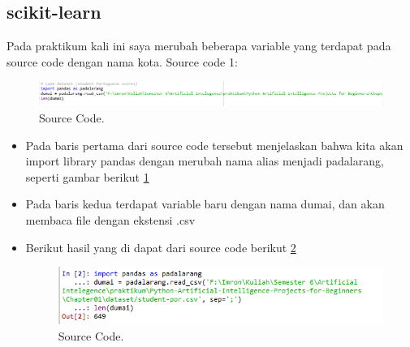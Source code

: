 \subsection{scikit-learn}
Pada praktikum kali ini saya merubah beberapa variable yang terdapat pada source code dengan nama kota.
Source code 1:
		\begin{figure}[ht]
		\centerline{\includegraphics[width=1\textwidth]{figures/im/imQ1.png}}
		\caption{Source Code.}
		\label{satuQ}
		\end{figure}
\begin{itemize}
\item Pada baris pertama dari source code tersebut menjelaskan bahwa kita akan import library pandas dengan merubah nama alias menjadi padalarang, seperti gambar berikut \ref{satuQ}
\item Pada baris kedua terdapat variable baru dengan nama dumai, dan akan membaca file dengan ekstensi .csv
\item Berikut hasil yang di dapat dari source code berikut \ref{satuC}
		\begin{figure}[ht]
		\centerline{\includegraphics[width=1\textwidth]{figures/im/imCode1.png}}
		\caption{Source Code.}
		\label{satuC}
		\end{figure}
\end{itemize}

